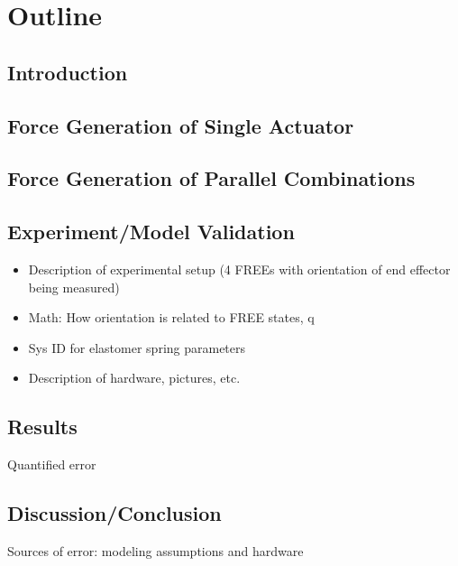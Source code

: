 \section{Outline}

\subsection{Introduction}
\subsection{Force Generation of Single Actuator}
\subsection{Force Generation of Parallel Combinations}
\subsection{Experiment/Model Validation}
\begin{itemize}
    \item Description of experimental setup (4 FREEs with orientation of end effector being measured)
    \item Math: How orientation is related to FREE states, q
    \item Sys ID for elastomer spring parameters
    \item Description of hardware, pictures, etc.
\end{itemize}
\subsection{Results}
Quantified error
\subsection{Discussion/Conclusion}
Sources of error: modeling assumptions and hardware